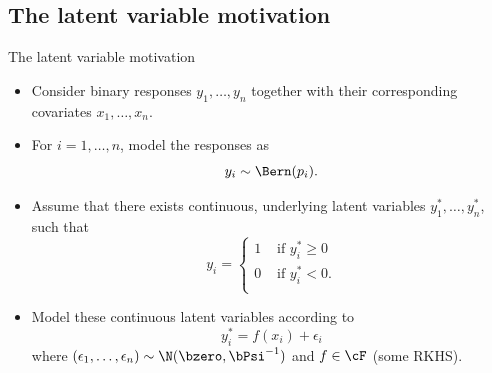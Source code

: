 \subsection{The latent variable motivation}

\begin{frame}{The latent variable motivation}
  \begin{itemize}
    \item Consider binary responses $y_1, \dots, y_n$ together with their corresponding covariates $x_1, \dots, x_n$. 
    \item For $i=1,\dots,n$, model the responses as
    \[
      y_i \sim \Bern(p_i).
    \]
    \item Assume that there exists continuous, underlying latent variables $y_1^*, \dots, y_n^*$, such that
    \[
      y_i =
      \begin{cases}
        1 & \text{ if } y_i^* \geq 0 \\
        0 & \text{ if } y_i^* < 0.    \\
      \end{cases}
    \]
    \item Model these continuous latent variables according to
    \[
      y_i^* = f(x_i) + \epsilon_i
    \]
    where $(\epsilon_1, \dots, \epsilon_n) \sim \N(\bzero, \bPsi^{-1})$ and $f \in \cF$ (some RKHS).
  \end{itemize}
\end{frame}

